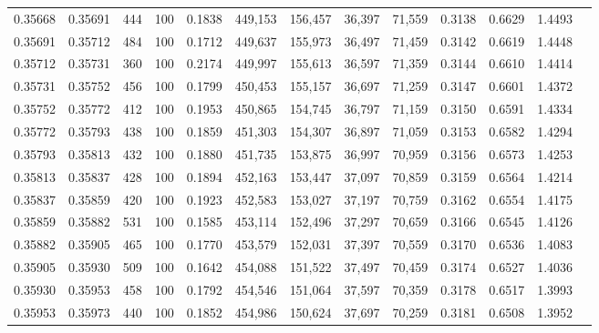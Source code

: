 \begin{tabular}{rrrrrrrrrrrrr}
0.35668 & 0.35691 &    444 & 100 &                                     0.1838 & 449,153 & 156,457 &  36,397 &  71,559 & 0.3138 & 0.6629 & 1.4493 \\
0.35691 & 0.35712 &    484 & 100 &                                     0.1712 & 449,637 & 155,973 &  36,497 &  71,459 & 0.3142 & 0.6619 & 1.4448 \\
0.35712 & 0.35731 &    360 & 100 &                                     0.2174 & 449,997 & 155,613 &  36,597 &  71,359 & 0.3144 & 0.6610 & 1.4414 \\
0.35731 & 0.35752 &    456 & 100 &                                     0.1799 & 450,453 & 155,157 &  36,697 &  71,259 & 0.3147 & 0.6601 & 1.4372 \\
0.35752 & 0.35772 &    412 & 100 &                                     0.1953 & 450,865 & 154,745 &  36,797 &  71,159 & 0.3150 & 0.6591 & 1.4334 \\
0.35772 & 0.35793 &    438 & 100 &                                     0.1859 & 451,303 & 154,307 &  36,897 &  71,059 & 0.3153 & 0.6582 & 1.4294 \\
0.35793 & 0.35813 &    432 & 100 &                                     0.1880 & 451,735 & 153,875 &  36,997 &  70,959 & 0.3156 & 0.6573 & 1.4253 \\
0.35813 & 0.35837 &    428 & 100 &                                     0.1894 & 452,163 & 153,447 &  37,097 &  70,859 & 0.3159 & 0.6564 & 1.4214 \\
0.35837 & 0.35859 &    420 & 100 &                                     0.1923 & 452,583 & 153,027 &  37,197 &  70,759 & 0.3162 & 0.6554 & 1.4175 \\
0.35859 & 0.35882 &    531 & 100 &                                     0.1585 & 453,114 & 152,496 &  37,297 &  70,659 & 0.3166 & 0.6545 & 1.4126 \\
0.35882 & 0.35905 &    465 & 100 &                                     0.1770 & 453,579 & 152,031 &  37,397 &  70,559 & 0.3170 & 0.6536 & 1.4083 \\
0.35905 & 0.35930 &    509 & 100 &                                     0.1642 & 454,088 & 151,522 &  37,497 &  70,459 & 0.3174 & 0.6527 & 1.4036 \\
0.35930 & 0.35953 &    458 & 100 &                                     0.1792 & 454,546 & 151,064 &  37,597 &  70,359 & 0.3178 & 0.6517 & 1.3993 \\
0.35953 & 0.35973 &    440 & 100 &                                     0.1852 & 454,986 & 150,624 &  37,697 &  70,259 & 0.3181 & 0.6508 & 1.3952 \\

\end{tabular}
